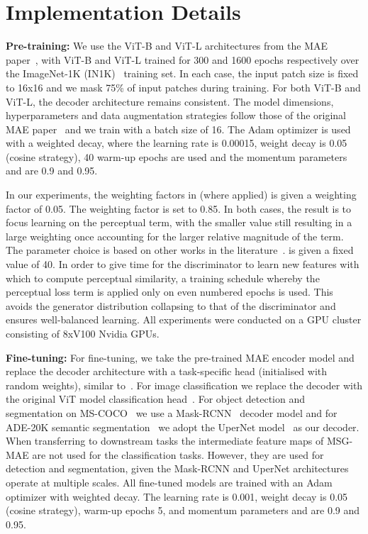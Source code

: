 \documentclass[10pt,twocolumn,letterpaper, cta-author]{article}
\begin{document}
\section{Implementation Details}

\textbf{Pre-training:} We use the ViT-B and ViT-L architectures from the MAE paper~\cite{MaskedAutoencoders2021}, with ViT-B and ViT-L trained for 300 and 1600 epochs respectively over the ImageNet-1K (IN1K)~\cite{5206848} training set. In each case, the input patch size is fixed to 16x16 and we mask 75\% of input patches during training. For both ViT-B and ViT-L, the decoder architecture remains consistent. The model dimensions, hyperparameters and data augmentation strategies follow those of the original MAE paper~\cite{MaskedAutoencoders2021} and we train with a batch size of 16. The Adam optimizer is used with a weighted decay, where the learning rate is 0.00015, weight decay is 0.05 (cosine strategy), 40 warm-up epochs are used and the momentum parameters  and  are 0.9 and 0.95.

In our experiments, the weighting factors in  (where applied) is given a weighting factor  of 0.05. The  weighting factor  is set to 0.85. In both cases, the result is to focus learning on the perceptual term, with the smaller  value still resulting in a large weighting once accounting for the larger relative magnitude of the  term. The parameter choice is based on other works in the literature~\cite{9352486, Liu2018ImageIF, wang2018pix2pixHD}.  is given a fixed value of 40. In order to give time for the discriminator to learn new features with which to compute perceptual similarity, a training schedule whereby the perceptual loss term  is applied only on even numbered epochs is used. This avoids the generator distribution collapsing to that of the discriminator and ensures well-balanced learning. All experiments were conducted on a GPU cluster consisting of 8xV100 Nvidia GPUs.




\textbf{Fine-tuning:} For fine-tuning, we take the pre-trained MAE encoder model and replace the decoder architecture with a task-specific head (initialised with random weights), similar to~\cite{MaskedAutoencoders2021}. For image classification we replace the decoder with the original ViT model classification head~\cite{50650}. For object detection and segmentation on MS-COCO~\cite{502} we use a Mask-RCNN~\cite{8237584} decoder model and for ADE-20K semantic segmentation~\cite{zhou2019semantic} we adopt the UperNet model~\cite{xiao2018unified} as our decoder. When transferring to downstream tasks the intermediate feature maps of MSG-MAE are not used for the classification tasks. However, they are used for detection and segmentation, given the Mask-RCNN and UperNet architectures operate at multiple scales. All fine-tuned models are trained with an Adam optimizer with weighted decay. The learning rate is 0.001, weight decay is 0.05 (cosine strategy), warm-up epochs 5, and momentum parameters  and  are 0.9 and 0.95.
\end{document}
